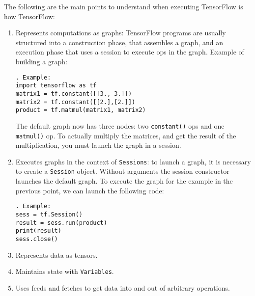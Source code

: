 \documentclass[11pt,a4paper]{article}
\begin{document}
The following are the main points to understand when executing TensorFlow is how TensorFlow: 
\begin{enumerate}
	\item Represents computations as graphs: TensorFlow programs are usually structured into a construction phase, that assembles a graph, and an execution phase that uses a session to execute ops in the graph. Example of building a graph: 
	\begin{lstlisting}. Example: 
import tensorflow as tf
matrix1 = tf.constant([[3., 3.]])
matrix2 = tf.constant([[2.],[2.]])
product = tf.matmul(matrix1, matrix2)
\end{lstlisting}
The default graph now has three nodes: two \texttt{constant()} ops and one \texttt{matmul()} op. To actually multiply the matrices, and get the result of the multiplication, you must launch the graph in a session.
	\item Executes graphs in the context of \texttt{Sessions}: to launch a graph, it is necessary to create a \texttt{Session} object. Without arguments the session constructor launches the default graph. To execute the graph for the example in the previous point, we can launch the following code: 
	\begin{lstlisting}. Example: 
sess = tf.Session()
result = sess.run(product)
print(result)
sess.close()
\end{lstlisting}
	
	\item Represents data as tensors. 
	\item Maintains state with \texttt{Variables}. 
	\item Uses feeds and fetches to get data into and out of arbitrary operations. 
\end{enumerate}
\end{document}
